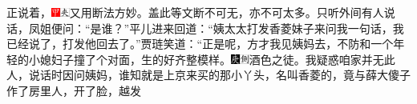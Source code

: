 {{{正说着，{\includegraphics[width=3mm]{../Images/00002}\includegraphics[width=3mm]{../Images/00012}\footnotesize \kaishu 又用断法方妙。盖此等文断不可无，亦不可太多。}只听外间有人说话，凤姐便问：“是谁？”平儿进来回道：“姨太太打发香菱妹子来问我一句话，我已经说了，打发他回去了。”贾琏笑道：“正是呢，方才我见姨妈去，不防和一个年轻的小媳妇子撞了个对面，生的好齐整模样。{\includegraphics[width=3mm]{../Images/00004}\includegraphics[width=3mm]{../Images/00011}\footnotesize \kaishu 酒色之徒。}我疑惑咱家并无此人，说话时因问姨妈，谁知就是上京来买的那小丫头，名叫香菱的，竟与薛大傻子作了房里人，开了脸，越发}}}
